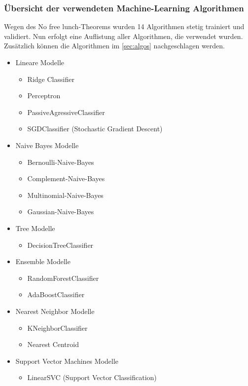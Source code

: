 \subsubsection{Übersicht der verwendeten Machine-Learning Algorithmen}\label{sub:clf}
Wegen des \glqq No free lunch\grqq{}-Theorems wurden 14 Algorithmen stetig trainiert und validiert.
Nun erfolgt eine Auflistung aller Algorithmen, die verwendet wurden.
Zusätzlich können die Algorithmen im \cref{sec:algos} nachgeschlagen werden.
\begin{itemize}
	\item Lineare Modelle
	\begin{itemize}
		\item Ridge Classifier
		\item Perceptron
		\item PassiveAgressiveClassifier
		\item SGDClassifier (Stochastic Gradient Descent)
	\end{itemize}
	\item Naive Bayes Modelle
	\begin{itemize}
		\item Bernoulli-Naive-Bayes
		\item Complement-Naive-Bayes
		\item Multinomial-Naive-Bayes
		\item Gaussian-Naive-Bayes
	\end{itemize}
	\item Tree Modelle
	\begin{itemize}
		\item DecisionTreeClassifier
	\end{itemize}
	\item Ensemble Modelle
	\begin{itemize}
		\item RandomForestClassifier
		\item AdaBoostClassifier
	\end{itemize}
	\item Nearest Neighbor Modelle
	\begin{itemize}
		\item KNeighborClassifier
		\item Nearest Centroid
	\end{itemize}
	\item Support Vector Machines Modelle
	\begin{itemize}
		\item LinearSVC (Support Vector Classification)
	\end{itemize}
\end{itemize}
